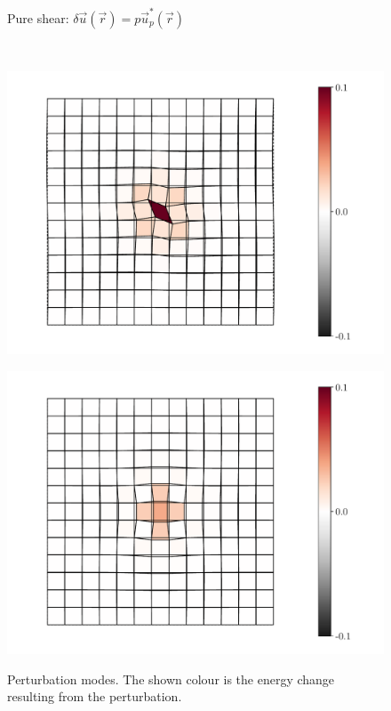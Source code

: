 \documentclass[fleqn]{goose-article}
\begin{document}
\begin{figure}[htp]
\begin{minipage}[t]{.49\textwidth}
{            Pure shear:
            $\delta \vec{u}(\vec{r}) = p \vec{u}^*_p (\vec{r})$
        }
        \label{fig:perturbation:pure-shear}
    \end{minipage}
    \\
    \begin{minipage}[t]{.49\textwidth}
        \centering
        \includegraphics[width=\textwidth]{perturbation_minus-simple-shear_energy.pdf}
        \label{fig:perturbation:simple-shear:neg}
    \end{minipage}
    \hfill
    \begin{minipage}[t]{.49\textwidth}
        \centering
        \includegraphics[width=\textwidth]{perturbation_minus-pure-shear_energy.pdf}
        \label{fig:perturbation:pure-shear:neg}
    \end{minipage}
    \caption{
        Perturbation modes.
        The shown colour is the energy change resulting from the perturbation.
    }
    \label{fig:perturbation}
\end{figure}
\end{document}
